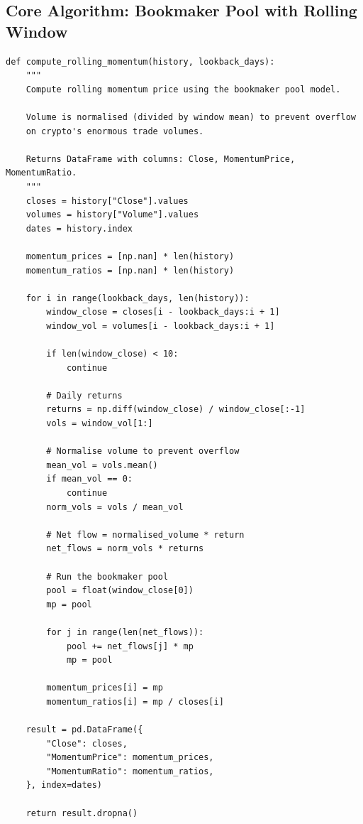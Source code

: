 \documentclass[11pt,a4paper]{article}
\begin{document}
\subsection{Core Algorithm: Bookmaker Pool with Rolling Window}

\begin{codebox}
\begin{lstlisting}[style=python]
def compute_rolling_momentum(history, lookback_days):
    """
    Compute rolling momentum price using the bookmaker pool model.

    Volume is normalised (divided by window mean) to prevent overflow
    on crypto's enormous trade volumes.

    Returns DataFrame with columns: Close, MomentumPrice, MomentumRatio.
    """
    closes = history["Close"].values
    volumes = history["Volume"].values
    dates = history.index

    momentum_prices = [np.nan] * len(history)
    momentum_ratios = [np.nan] * len(history)

    for i in range(lookback_days, len(history)):
        window_close = closes[i - lookback_days:i + 1]
        window_vol = volumes[i - lookback_days:i + 1]

        if len(window_close) < 10:
            continue

        # Daily returns
        returns = np.diff(window_close) / window_close[:-1]
        vols = window_vol[1:]

        # Normalise volume to prevent overflow
        mean_vol = vols.mean()
        if mean_vol == 0:
            continue
        norm_vols = vols / mean_vol

        # Net flow = normalised_volume * return
        net_flows = norm_vols * returns

        # Run the bookmaker pool
        pool = float(window_close[0])
        mp = pool

        for j in range(len(net_flows)):
            pool += net_flows[j] * mp
            mp = pool

        momentum_prices[i] = mp
        momentum_ratios[i] = mp / closes[i]

    result = pd.DataFrame({
        "Close": closes,
        "MomentumPrice": momentum_prices,
        "MomentumRatio": momentum_ratios,
    }, index=dates)

    return result.dropna()
\end{lstlisting}
\end{codebox}
\end{document}
